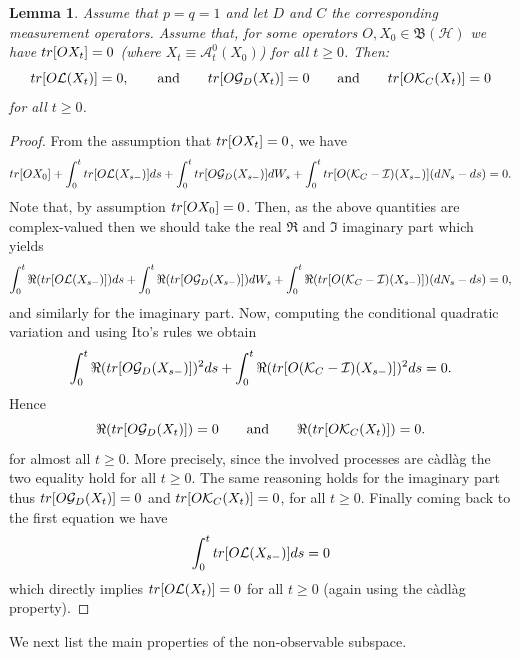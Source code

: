 \documentclass[aihp,12pt]{imsart}
\newcommand{\Gc}{\mathcal{G}}
\newcommand{\Hc}{\mathcal{H}}
\newcommand{\Ic}{\mathcal{I}}
\newcommand{\Kc}{\mathcal{K}}
\newcommand{\Lc}{\mathcal{L}}
\newcommand{\Bf}{\mathfrak{B}}
\newcommand{\tr}{{\rm tr}}
\theoremstyle{theorem}
\newtheorem{lemma}{Lemma}
\theoremstyle{definition}
\theoremstyle{remark}
\begin{document}
\begin{lemma}
\label{lem:trick}
    Assume that $p=q=1$ and let $D$ and $C$ the corresponding measurement operators. Assume that, for some operators $O,X_0\in\Bf(\Hc)$ we have $\tr[OX_t]=0$ (where $X_t\equiv \mathcal A_t^0 (X_0)$) for all $t\geq0$. Then: 
    \[\tr[O\Lc(X_t)]=0, \qquad\text{and}\qquad \tr[O\Gc_D(X_t)]=0 \qquad\text{and}\qquad \tr[O\Kc_C(X_t)]=0\] for all $t\geq0$. 
\end{lemma}
\begin{proof}
    From the assumption that $\tr[O X_t]=0$, we have
    \[\tr[O X_0] + \int_0^t \tr[O \Lc(X_{s-})]ds + \int_0^{t} \tr[O\Gc_D(X_{s-})]dW_s + \int_{0}^t \tr[O(\Kc_{C}-\Ic)(X_{s-})](dN_s-ds) = 0.\]
    Note that, by assumption $\tr[O X_0]=0$. Then, as the above quantities are complex-valued then we should take the real $\Re$ and $\Im$ imaginary part which yields 
    \[\int_0^t \Re(\tr[O \Lc(X_{s-})])ds + \int_0^{t} \Re(\tr[O\Gc_D(X_{s-})])dW_s + \int_{0}^t \Re(\tr[O(\Kc_{C}-\Ic)(X_{s-})])(dN_s-ds) = 0,\]
    and similarly for the imaginary part. 
    Now, computing the conditional quadratic variation and using Ito's rules we obtain
    \[\int_0^t \Re(\tr[O \Gc_D(X_{s-})])^2 ds + \int_{0}^t \Re(\tr[O(\Kc_{C}-\Ic)(X_{s-})])^2 ds = 0.\]
    Hence
    \[\Re(\tr[O\Gc_{D}(X_t)])=0\qquad\text{and}\qquad \Re(\tr[O\Kc_{C}(X_t)])=0.\] for almost all $t\geq0$. More precisely, since the involved processes are c\`adl\`ag the two equality hold for all $t\geq0$. The same reasoning holds for the imaginary part thus \(\tr[O\Gc_{D}(X_t)]=0\) and \(\tr[O\Kc_{C}(X_t)]=0\), for all $t\geq0$. Finally coming back to the first equation we have 
    \[\int_{0}^t \tr[O\Lc(X_{s-})]ds = 0\] which directly implies $\tr[O\Lc(X_t)] = 0$ for all $t\geq0$ (again using the c\`adl\`ag property).
\end{proof}


We next list the main properties of the non-observable subspace. 
 
\end{document}

